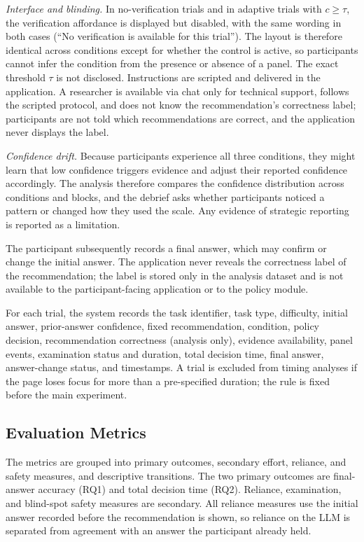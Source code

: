 \documentclass[oneside,final,14pt,a4paper]{extreport}
\begin{document}
\emph{Interface and blinding.} In no-verification trials and in adaptive
trials with $c\geq\tau$, the verification affordance is displayed but
disabled, with the same wording in both cases (``No verification is available
for this trial''). The layout is therefore identical across conditions except
for whether the control is active, so participants cannot infer the condition
from the presence or absence of a panel. The exact threshold $\tau$ is not
disclosed. Instructions are scripted and delivered in the application. A
researcher is available via chat only for technical support, follows the
scripted protocol, and does not know the recommendation's correctness label;
participants are not told which recommendations are correct, and the application
never displays the label.

\emph{Confidence drift.} Because participants experience all three conditions,
they might learn that low confidence triggers evidence and adjust their reported
confidence accordingly. The analysis therefore compares the confidence
distribution across conditions and blocks, and the debrief asks whether
participants noticed a pattern or changed how they used the scale. Any evidence
of strategic reporting is reported as a limitation.

The participant subsequently records a final answer, which may confirm or change
the initial answer. The application never reveals the correctness label of the
recommendation; the label is stored only in the analysis dataset and is not
available to the participant-facing application or to the policy module.

For each trial, the system records the task identifier, task type, difficulty,
initial answer, prior-answer confidence, fixed recommendation, condition,
policy decision, recommendation correctness (analysis only), evidence
availability, panel events, examination status and duration, total decision
time, final answer, answer-change status, and timestamps. A trial is excluded
from timing analyses if the page loses focus for more than a pre-specified
duration; the rule is fixed before the main experiment.

\subsection{Evaluation Metrics}
\label{subsec:metrics}

The metrics are grouped into primary outcomes, secondary effort, reliance, and
safety measures, and descriptive transitions. The two primary outcomes are
final-answer accuracy (RQ1) and total decision time (RQ2). Reliance,
examination, and blind-spot safety measures are secondary. All reliance measures
use the initial answer recorded before the recommendation is shown, so reliance
on the LLM is separated from agreement with an answer the participant already
held.
\end{document}
